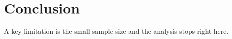 
\section{Conclusion}
A key limitation is the small sample size and the analysis stops right here.

